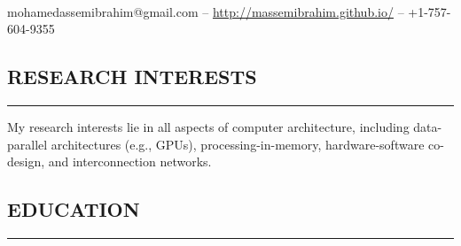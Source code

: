 \documentclass[10pt,a4]{article}
\begin{document}
\thispagestyle{empty}

\pagestyle{fancy}
\fancyhf{}
\cfoot{{\thepage}}
\renewcommand{\headrulewidth}{0pt}
\renewcommand{\footrulewidth}{0pt}
\long{}
\sloppypar


\begin{center}
\hspace{-0.4in}{\huge \bf Mohamed Assem Ibrahim} \\
\vspace*{0.5cm}
mohamedassemibrahim@gmail.com -- \url{http://massemibrahim.github.io/} -- +1-757-604-9355
\end{center}


\subsection*{RESEARCH INTERESTS}
\hrule
\vspace{0.2cm}
\begin{list}{}{}
\item 
My research interests lie in all aspects of computer architecture, including data-parallel architectures (e.g., GPUs), processing-in-memory, hardware-software co-design, and interconnection networks.
\end{list}

\subsection*{EDUCATION}

\hrule
\vspace{0.2cm}
\end{document}
